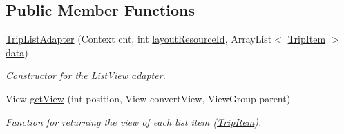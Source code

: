 \subsection*{Public Member Functions}
\begin{DoxyCompactItemize}
\item 
\hyperlink{classcom_1_1jack_1_1motorbikestatistics_1_1_trip_list_adapter_ace5ca232bac9a2a6e0d1b61e88b35546}{Trip\+List\+Adapter} (Context cnt, int \hyperlink{classcom_1_1jack_1_1motorbikestatistics_1_1_trip_list_adapter_a72f8d17ad7f1dc531cbe0015b2f29454}{layout\+Resource\+Id}, Array\+List$<$ \hyperlink{classcom_1_1jack_1_1motorbikestatistics_1_1_trip_item}{Trip\+Item} $>$ \hyperlink{classcom_1_1jack_1_1motorbikestatistics_1_1_trip_list_adapter_af0219927cf42917085d1e43abf62374d}{data})
\begin{DoxyCompactList}\small\item\em Constructor for the List\+View adapter. \end{DoxyCompactList}\item 
View \hyperlink{classcom_1_1jack_1_1motorbikestatistics_1_1_trip_list_adapter_a1cfdc3feff28941d18e70ce0979d959d}{get\+View} (int position, View convert\+View, View\+Group parent)
\begin{DoxyCompactList}\small\item\em Function for returning the view of each list item (\hyperlink{classcom_1_1jack_1_1motorbikestatistics_1_1_trip_item}{Trip\+Item}). \end{DoxyCompactList}\end{DoxyCompactItemize}

